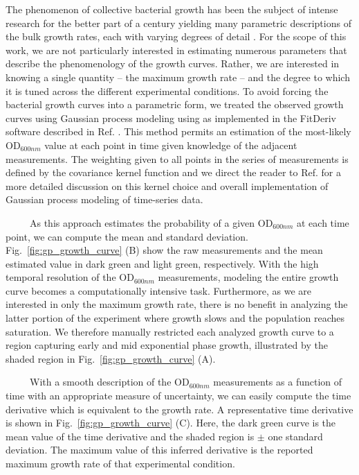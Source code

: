 \documentclass[12pt]{caltech_thesis}
\begin{document}
The phenomenon of collective bacterial growth has been the subject of
intense research for the better part of a century
\autocite{schaechter1958,jun2018} yielding many parametric descriptions
of the bulk growth rates, each with varying degrees of detail
\autocite{jun2018,allen2018}. For the scope of this work, we are not
particularly interested in estimating numerous parameters that describe
the phenomenology of the growth curves. Rather, we are interested in
knowing a single quantity -- the maximum growth rate -- and the degree
to which it is tuned across the different experimental conditions. To
avoid forcing the bacterial growth curves into a parametric form, we
treated the observed growth curves using Gaussian process modeling using
as implemented in the FitDeriv software described in Ref.
\autocite{swain2016}. This method permits an estimation of the
most-likely OD\(_{600nm}\) value at each point in time given knowledge
of the adjacent measurements. The weighting given to all points in the
series of measurements is defined by the covariance kernel function and
we direct the reader to Ref. \autocite{swain2016} for a more detailed
discussion on this kernel choice and overall implementation of Gaussian
process modeling of time-series data.

~~~~~As this approach estimates the probability of a given
OD\(_{600nm}\) at each time point, we can compute the mean and standard
deviation. Fig.~\ref{fig:gp_growth_curve} (B) show the raw measurements
and the mean estimated value in dark green and light green,
respectively. With the high temporal resolution of the OD\(_{600nm}\)
measurements, modeling the entire growth curve becomes a computationally
intensive task. Furthermore, as we are interested in only the maximum
growth rate, there is no benefit in analyzing the latter portion of the
experiment where growth slows and the population reaches saturation. We
therefore manually restricted each analyzed growth curve to a region
capturing early and mid exponential phase growth, illustrated by the
shaded region in Fig.~\ref{fig:gp_growth_curve} (A).

~~~~~With a smooth description of the OD\(_{600nm}\) measurements as a
function of time with an appropriate measure of uncertainty, we can
easily compute the time derivative which is equivalent to the growth
rate. A representative time derivative is shown in
Fig.~\ref{fig:gp_growth_curve} (C). Here, the dark green curve is the
mean value of the time derivative and the shaded region is \(\pm\) one
standard deviation. The maximum value of this inferred derivative is the
reported maximum growth rate of that experimental condition.
\end{document}
